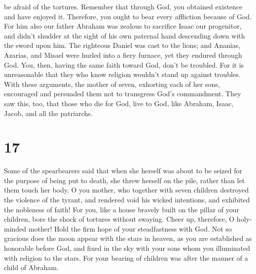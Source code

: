 be afraid of the tortures.  Remember that through God,
you obtained existence and have enjoyed it.  Therefore,
you ought to bear every affliction because of God.  For
him also our father Abraham was zealous to sacrifice Isaac our
progenitor, and didn't shudder at the sight of his own paternal hand
descending down with the sword upon him.  The righteous
Daniel was cast to the lions; and Ananias, Azarias, and Misael were
hurled into a fiery furnace, yet they endured through God.
 You, then, having the same faith toward God, don't be
troubled.  For it is unreasonable that they who know
religion wouldn't stand up against troubles.  With these
arguments, the mother of seven, exhorting each of her sons, encouraged
and persuaded them not to transgress God's commandment. 
They saw this, too, that those who die for God, live to God, like
Abraham, Isaac, Jacob, and all the patriarchs.

\hypertarget{section-16}{%
\section{17}\label{section-16}}

 Some of the spearbearers said that when she herself was
about to be seized for the purpose of being put to death, she threw
herself on the pile, rather than let them touch her body. 
O you mother, who together with seven children destroyed the violence of
the tyrant, and rendered void his wicked intentions, and exhibited the
nobleness of faith!  For you, like a house bravely built
on the pillar of your children, bore the shock of tortures without
swaying.  Cheer up, therefore, O holy-minded mother! Hold
the firm hope of your steadfastness with God.  Not so
gracious does the moon appear with the stars in heaven, as you are
established as honorable before God, and fixed in the sky with your sons
whom you illuminated with religion to the stars.  For your
bearing of children was after the manner of a child of Abraham.

